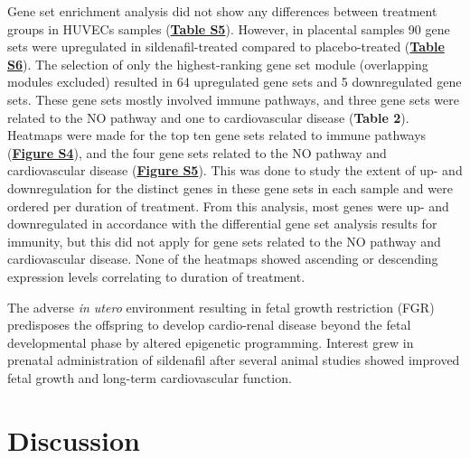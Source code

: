 \documentclass[authordate, empirical,issue]{jote-new-article}
\begin{document}
Gene set enrichment analysis did not show any differences between treatment groups in HUVECs samples (\textbf{\href{https://journal.trialanderror.org/pub/prenatal-sildenafil-pregnancies\#supplementary-materials}{Table S5}}). However, in placental samples 90 gene sets were upregulated in sildenafil-treated compared to placebo-treated (\textbf{\href{https://journal.trialanderror.org/pub/prenatal-sildenafil-pregnancies\#supplementary-materials}{Table S6}}). The selection of only the highest-ranking gene set module (overlapping modules excluded) resulted in 64 upregulated gene sets and 5 downregulated gene sets. These gene sets mostly involved immune pathways, and three gene sets were related to the NO pathway and one to cardiovascular disease (\textbf{Table 2}). Heatmaps were made for the top ten gene sets related to immune pathways (\textbf{\href{https://journal.trialanderror.org/pub/prenatal-sildenafil-pregnancies\#supplementary-materials}{Figure S4}}), and the four gene sets related to the NO pathway and cardiovascular disease (\textbf{\href{https://journal.trialanderror.org/pub/prenatal-sildenafil-pregnancies\#supplementary-materials}{Figure S5}}). This was done to study the extent of up- and downregulation for the distinct genes in these gene sets in each sample and were ordered per duration of treatment. From this analysis, most genes were up- and downregulated in accordance with the differential gene set analysis results for immunity, but this did not apply for gene sets related to the NO pathway and cardiovascular disease. None of the heatmaps showed ascending or descending expression levels correlating to duration of treatment.



The adverse \emph{in utero }environment resulting in fetal growth restriction (FGR) predisposes the offspring to develop cardio-renal disease beyond the fetal developmental phase by altered epigenetic programming. Interest grew in prenatal administration of sildenafil after several animal studies showed improved fetal growth and long-term cardiovascular function.



\section{Discussion}
\end{document}
